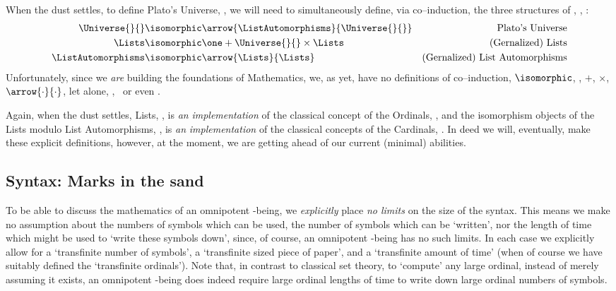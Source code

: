 \documentclass[a4paper,openany]{amsbook}
\begin{document}
When the dust settles, to define Plato's Universe, \Universe{}{}, we will need to
simultaneously define, via co--induction, the three structures of \Universe{}{},
\Lists, \ListAutomorphisms:
%
\begin{align}
   \Universe{}{}          & \isomorphic \arrow{\ListAutomorphisms}{\Universe{}{}} & 
   \text{Plato's Universe} \\
   \Lists             & \isomorphic \one + \Universe{}{} \times \Lists        & 
   \text{(Gernalized) Lists} \\
   \ListAutomorphisms & \isomorphic \arrow{\Lists}{\Lists}                & \text{(Gernalized) List Automorphisms}
\end{align}
%
Unfortunately, since we \emph{are} building the foundations of Mathematics, we,
as yet, have no definitions of co--induction, $\isomorphic$, \one, $+$, $\times$,
$\arrow{\cdot}{\cdot}$, let alone, \Universe{}{}, \Lists\ or even \ListAutomorphisms.

Again, when the dust settles, Lists, \Lists, is \emph{an} \emph{implementation}
of the classical concept of the Ordinals, \Ordinal, and the isomorphism objects
of the Lists modulo List Automorphisms, \ListAutomorphisms, is \emph{an}
\emph{implementation} of the classical concepts of the Cardinals, \Cardinal. In
deed we will, eventually, make these explicit definitions, however, at the
moment, we are getting ahead of our current (minimal) abilities.

\subsection{Syntax: Marks in the sand}

To be able to discuss the mathematics of an omnipotent \Cardinal-being, we
\emph{explicitly} place \emph{no limits} on the size of the syntax. This means we
make no assumption about the numbers of symbols which can be used, the number of
symbols which can be `written', nor the length of time which might be used to
`write these symbols down', since, of course, an omnipotent \Cardinal-being has
no such limits. In each case we explicitly allow for a `transfinite number of
symbols', a `transfinite sized piece of paper', and a `transfinite amount of
time' (when of course we have suitably defined the `transfinite ordinals'). Note
that, in contrast to classical set theory, to `compute' any large ordinal,
instead of merely assuming it exists, an omnipotent \Cardinal-being does indeed
require large ordinal lengths of time to write down large ordinal numbers of
symbols.
\end{document}
